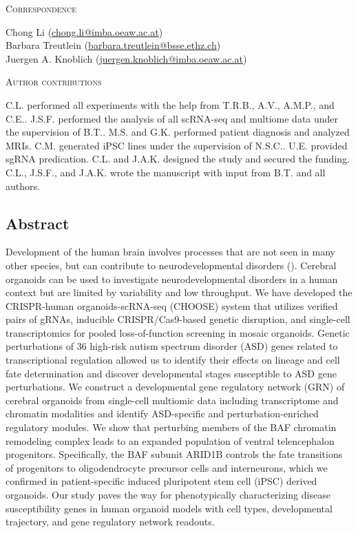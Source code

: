\noindent
{\large\textsc{Correspondence}} 

\noindent
Chong Li (\href{mailto:chong.li@imba.oeaw.ac.at}{chong.li@imba.oeaw.ac.at})\\
Barbara Treutlein (\href{mailto:barbara.treutlein@bsse.ethz.ch}{barbara.treutlein@bsse.ethz.ch})\\
Juergen A. Knoblich (\href{mailto:juergen.knoblich@imba.oeaw.ac.at}{juergen.knoblich@imba.oeaw.ac.at})

\vspace{1cm}

\noindent
{\large\textsc{Author contributions}} 

\noindent
C.L. performed all experiments with the help from T.R.B., A.V., A.M.P., and C.E.. J.S.F. performed the analysis of all scRNA-seq and multiome data under the supervision of B.T.. M.S. and G.K. performed patient diagnosis and analyzed MRIs. C.M. generated iPSC lines under the supervision of N.S.C.. U.E. provided sgRNA predication. C.L. and J.A.K. designed the study and secured the funding. C.L., J.S.F., and J.A.K. wrote the manuscript with input from B.T. and all authors. 


\subsection{Abstract}
Development of the human brain involves processes that are not seen in many other species, but can contribute to neurodevelopmental disorders (\cite{hu_diverse_2014,klingler_mapping_2021,libe-philippot_cellular_2021,lui_development_2011}). Cerebral organoids can be used to investigate neurodevelopmental disorders in a human context but are limited by variability and low throughput. We have developed the CRISPR-human organoids-scRNA-seq (CHOOSE) system that utilizes verified pairs of gRNAs, inducible CRISPR/Cas9-based genetic disruption, and single-cell transcriptomics for pooled loss-of-function screening in mosaic organoids. Genetic perturbations of 36 high-risk autism spectrum disorder (ASD) genes related to transcriptional regulation allowed us to identify their effects on lineage and cell fate determination and discover developmental stages susceptible to ASD gene perturbations. We construct a developmental gene regulatory network (GRN) of cerebral organoids from single-cell multiomic data including transcriptome and chromatin modalities and identify ASD-specific and perturbation-enriched regulatory modules. We show that perturbing members of the BAF chromatin remodeling complex leads to an expanded population of ventral telencephalon progenitors. Specifically, the BAF subunit ARID1B controls the fate transitions of progenitors to oligodendrocyte precursor cells and interneurons, which we confirmed in patient-specific induced pluripotent stem cell (iPSC) derived organoids. Our study paves the way for phenotypically characterizing disease susceptibility genes in human organoid models with cell types, developmental trajectory, and gene regulatory network readouts.

